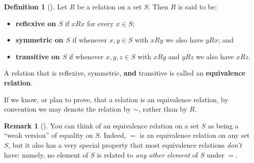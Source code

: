 \documentclass[10pt,]{book}
\newcommand{\terminology}[1]{\textbf{#1}}
\theoremstyle{plain}
\theoremstyle{definition}
\newtheorem{definition}[theorem]{Definition}
\theoremstyle{definition}
\newtheorem{remark}[theorem]{Remark}
\theoremstyle{definition}
\theoremstyle{definition}
\numberwithin{equation}{section}
\begin{document}
\begin{definition}[{}]\label{definition-58}
Let \(R\) be a relation on a set \(S\). Then \(R\) is said to be: \leavevmode%
\begin{itemize}[label=\textbullet]
\item{}\terminology{reflexive on \(S\)} if \(xR x\) for every \(x\in S\);%
\item{}\terminology{symmetric on \(S\)} if whenever \(x,y\in S\) with \(xR y\) we also have \(yR x\); and%
\item{}\terminology{transitive on \(S\)} if whenever \(x,y,z\in S\) with \(xR y\) and \(yR z\) we also have \(xR z\).%
\end{itemize}
%
\par
A relation that is reflexive, symmetric, \terminology{and} transitive is called an \terminology{equivalence relation}.%
\par
If we know, or plan to prove, that a relation is an equivalence relation, by convention we may denote the relation by \(\sim\), rather than by \(R\).%
\end{definition}
\begin{remark}[]\label{remark-35}
You can think of an equivalence relation on a set \(S\) as being a ``weak version'' of equality on \(S\).  Indeed, \(=\) is an equivalence relation on any set \(S\), but it also has a very special property that most equivalence relations \emph{don't} have: namely, no element of \(S\) is related to \emph{any other element} of \(S\) under \(=\).%
\end{remark}
\end{document}
